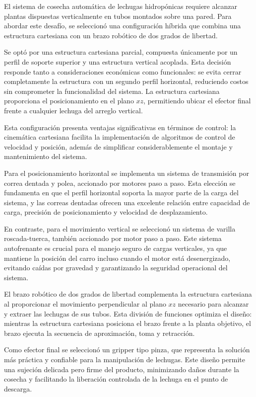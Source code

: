 El sistema de cosecha automática de lechugas hidropónicas requiere alcanzar plantas dispuestas verticalmente en tubos montados sobre una pared. Para abordar este desafío, se seleccionó una configuración híbrida que combina una estructura cartesiana con un brazo robótico de dos grados de libertad.

Se optó por una estructura cartesiana parcial, compuesta únicamente por un perfil de soporte superior y una estructura vertical acoplada. Esta decisión responde tanto a consideraciones económicas como funcionales: se evita cerrar completamente la estructura con un segundo perfil horizontal, reduciendo costos sin comprometer la funcionalidad del sistema. La estructura cartesiana proporciona el posicionamiento en el plano $xz$, permitiendo ubicar el efector final frente a cualquier lechuga del arreglo vertical.

Esta configuración presenta ventajas significativas en términos de control: la cinemática cartesiana facilita la implementación de algoritmos de control de velocidad y posición, además de simplificar considerablemente el montaje y mantenimiento del sistema.

Para el posicionamiento horizontal se implementa un sistema de transmisión por correa dentada y polea, accionado por motores paso a paso. Esta elección se fundamenta en que el perfil horizontal soporta la mayor parte de la carga del sistema, y las correas dentadas ofrecen una excelente relación entre capacidad de carga, precisión de posicionamiento y velocidad de desplazamiento.

En contraste, para el movimiento vertical se seleccionó un sistema de varilla roscada-tuerca, también accionado por motor paso a paso. Este sistema autofrenante es crucial para el manejo seguro de cargas verticales, ya que mantiene la posición del carro incluso cuando el motor está desenergizado, evitando caídas por gravedad y garantizando la seguridad operacional del sistema.

El brazo robótico de dos grados de libertad complementa la estructura cartesiana al proporcionar el movimiento perpendicular al plano $xz$ necesario para alcanzar y extraer las lechugas de sus tubos. Esta división de funciones optimiza el diseño: mientras la estructura cartesiana posiciona el brazo frente a la planta objetivo, el brazo ejecuta la secuencia de aproximación, toma y retracción.

Como efector final se seleccionó un gripper tipo pinza, que representa la solución más práctica y confiable para la manipulación de lechugas. Este diseño permite una sujeción delicada pero firme del producto, minimizando daños durante la cosecha y facilitando la liberación controlada de la lechuga en el punto de descarga.
